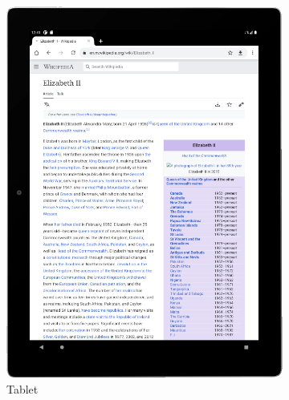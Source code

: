 \begin{figure}[t]
\begin{subfigure}{0.3\textwidth}
  \includegraphics[width=1\textwidth]{intropage_tablet}
  \caption{Tablet}
  \label{intropage_tablet}
\end{subfigure}%
\hspace{0.25in}
\begin{subfigure}{0.2\textwidth}
  \centering

\end{subfigure}
\end{figure}
